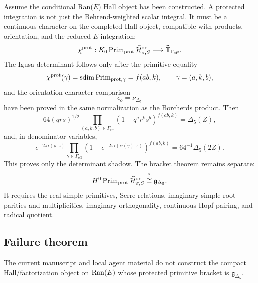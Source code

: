 Assume the conditional Ran(\(E\)) Hall object has been constructed.  A
protected integration is not just the Behrend-weighted scalar integral.
It must be a continuous character on the completed Hall object, compatible
with products, orientation, and the reduced \(E\)-integration:
\[
\chi^{\mathrm{prot}}:
K_0\operatorname{Prim}_{\mathrm{prot}}
\widehat{\mathcal H}^{\mathrm{or}}_{\sigma,S}
\longrightarrow
\widehat{\mathbb T}_{\Gamma_{\mathrm{eff}}}.
\]
The Igusa determinant follows only after the primitive equality
\[
\chi^{\mathrm{prot}}(\gamma)
=
\operatorname{sdim}\operatorname{Prim}_{\mathrm{prot},\gamma}
=f(ab,k),
\qquad \gamma=(a,k,b),
\]
and the orientation character comparison
\[
\epsilon_o=\nu_{\Delta_5}
\]
have been proved in the same normalization as the Borcherds product.
Then
\[
64(qrs)^{1/2}
\prod_{(a,k,b)\in\Gamma_{\mathrm{eff}}}
(1-q^a r^k s^b)^{f(ab,k)}
=\Delta_5(Z),
\]
and, in denominator variables,
\[
e^{-2\pi i(\rho,z)}
\prod_{\gamma\in\Gamma_{\mathrm{eff}}}
\left(1-e^{-2\pi i(\alpha(\gamma),z)}\right)^{f(ab,k)}
=64^{-1}\Delta_5(2Z).
\]
This proves only the determinant shadow.  The bracket theorem remains
separate:
\[
H^0\operatorname{Prim}_{\mathrm{prot}}
\widehat{\mathcal H}^{\mathrm{or}}_{\sigma,S}
\stackrel{?}{\cong}
\mathfrak g_{\Delta_5}.
\]
It requires the real simple primitives, Serre relations, imaginary
simple-root parities and multiplicities, imaginary orthogonality,
continuous Hopf pairing, and radical quotient.

\subsection{Failure theorem}

\begin{theorem}
\label{thm:ranE-present-obstruction}
The current manuscript and local agent material do not construct the
compact Hall/factorization object on \(\operatorname{Ran}(E)\) whose protected
primitive bracket is \(\mathfrak g_{\Delta_5}\).
\end{theorem}

